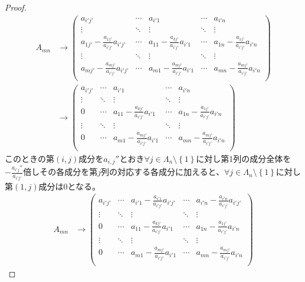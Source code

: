 \documentclass[dvipdfmx]{jsarticle}
\begin{document}
\begin{proof}
\begin{align*}
A_{mn} &\rightarrow \begin{pmatrix}
a_{i'j'} & \cdots & a_{i'1} & \cdots & a_{i'n} \\
 \vdots & \ddots & \vdots & \ddots & \vdots \\
a_{1j'} - \frac{a_{1j'}}{a_{i'j'}}a_{i'j'} & \cdots & a_{11} - \frac{a_{kj'}}{a_{i'j'}}a_{i'1} & \cdots & a_{1n} - \frac{a_{1j'}}{a_{i'j'}}a_{i'n} \\
 \vdots & \ddots & \vdots & \ddots & \vdots \\
a_{mj'} - \frac{a_{mj'}}{a_{i'j'}}a_{i'j'} & \cdots & a_{m1} - \frac{a_{mj'}}{a_{i'j'}}a_{i'1} & \cdots & a_{mn} - \frac{a_{mj'}}{a_{i'j'}}a_{i'n} \\
\end{pmatrix}\\
&\rightarrow \begin{pmatrix}
a_{i'j'} & \cdots & a_{i'1} & \cdots & a_{i'n} \\
 \vdots & \ddots & \vdots & \ddots & \vdots \\
0 & \cdots & a_{11} - \frac{a_{kj'}}{a_{i'j'}}a_{i'1} & \cdots & a_{1n} - \frac{a_{1j'}}{a_{i'j'}}a_{i'n} \\
 \vdots & \ddots & \vdots & \ddots & \vdots \\
0 & \cdots & a_{m1} - \frac{a_{mj'}}{a_{i'j'}}a_{i'1} & \cdots & a_{mn} - \frac{a_{mj'}}{a_{i'j'}}a_{i'n} \\
\end{pmatrix}
\end{align*}
このときの第$(i,j)$成分を$a_{i,j}''$とおき$\forall j \in \varLambda_{n} \setminus \left\{ 1 \right\}$に対し第1列の成分全体を$- \frac{a_{i'j}''}{a_{i'j'}}$倍しその各成分を第$j$列の対応する各成分に加えると、$\forall j \in \varLambda_{n} \setminus \left\{ 1 \right\}$に対し第$(1,j)$成分は0となる。
\begin{align*}
A_{mn} &\rightarrow \begin{pmatrix}
a_{i'j'} & \cdots & a_{i'1} - \frac{a_{i'1}}{a_{i'j'}}a_{i'j'} & \cdots & a_{i'n} - \frac{a_{i'n}}{a_{i'j'}}a_{i'j'} \\
 \vdots & \ddots & \vdots & \ddots & \vdots \\
0 & \cdots & a_{11} - \frac{a_{kj'}}{a_{i'j'}}a_{i'1} & \cdots & a_{1n} - \frac{a_{1j'}}{a_{i'j'}}a_{i'n} \\
 \vdots & \ddots & \vdots & \ddots & \vdots \\
0 & \cdots & a_{m1} - \frac{a_{mj'}}{a_{i'j'}}a_{i'1} & \cdots & a_{mn} - \frac{a_{mj'}}{a_{i'j'}}a_{i'n} \\

\end{pmatrix}
\end{align*}
\end{proof}
\end{document}
